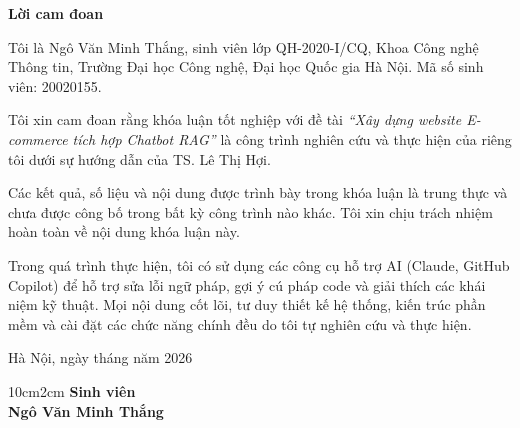 \setcounter{page}{1}
\begin{center}
\textbf{\large{Lời cam đoan}}
\end{center}

Tôi là Ngô Văn Minh Thắng, sinh viên lớp QH-2020-I/CQ, Khoa Công nghệ Thông tin, Trường Đại học Công nghệ, Đại học Quốc gia Hà Nội. Mã số sinh viên: 20020155.

Tôi xin cam đoan rằng khóa luận tốt nghiệp với đề tài \textit{``Xây dựng website E-commerce tích hợp Chatbot RAG''} là công trình nghiên cứu và thực hiện của riêng tôi dưới sự hướng dẫn của TS. Lê Thị Hợi.

Các kết quả, số liệu và nội dung được trình bày trong khóa luận là trung thực và chưa được công bố trong bất kỳ công trình nào khác. Tôi xin chịu trách nhiệm hoàn toàn về nội dung khóa luận này.

Trong quá trình thực hiện, tôi có sử dụng các công cụ hỗ trợ AI (Claude, GitHub Copilot) để hỗ trợ sửa lỗi ngữ pháp, gợi ý cú pháp code và giải thích các khái niệm kỹ thuật. Mọi nội dung cốt lõi, tư duy thiết kế hệ thống, kiến trúc phần mềm và cài đặt các chức năng chính đều do tôi tự nghiên cứu và thực hiện.

\begin{flushright}
Hà Nội, ngày \hspace{0.5cm} tháng \hspace{0.5cm} năm 2026
\end{flushright}

\begin{changemargin}{10cm}{2cm}
\textbf{Sinh viên}
\\[2cm]
\textbf{Ngô Văn Minh Thắng}
\end{changemargin}
